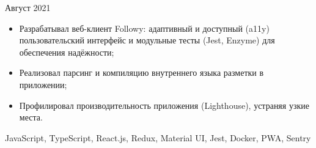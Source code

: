 \begin{experiences}
    {Август 2021}  {
                     \begin{itemize}
                     \item Разрабатывал веб-клиент Followy: адаптивный и доступный (a11y) пользовательский интерфейс и модульные тесты (Jest, Enzyme) для обеспечения надёжности;
                     \item Реализовал парсинг и компиляцию внутреннего языка разметки в приложении;
                     \item Профилировал производительность приложения (Lighthouse), устраняя узкие места.
                     \end{itemize}
                  }
                  {JavaScript, TypeScript, React.js, Redux, Material UI, Jest, Docker, PWA, Sentry}
\end{experiences}
